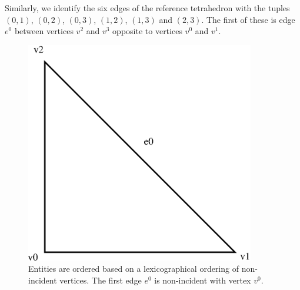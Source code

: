 Similarly, we identify the six edges of the reference tetrahedron with
the tuples $(0, 1)$, $(0, 2)$, $(0, 3)$, $(1, 2)$, $(1, 3)$ and
$(2, 3)$. The first of these is edge $e^0$ between vertices $v^2$ and
$v^3$ opposite to vertices $v^0$ and $v^1$.

\begin{figure}[H]
  \begin{center}
    \includegraphics[width=10cm]{eps/ordering_example_triangle.eps}
    \caption{Entities are ordered based on a lexicographical ordering
      of non-incident vertices. The first edge $e^0$ is non-incident
      with vertex $v^0$.}
    \label{fig:orderingexample}
  \end{center}
\end{figure}

